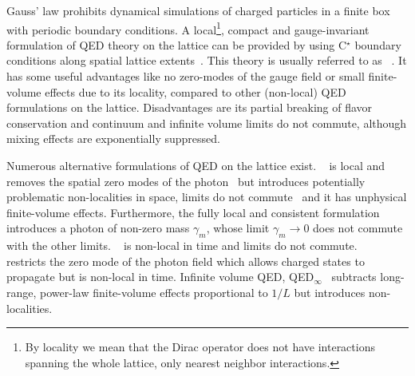 Gauss' law prohibits dynamical simulations of charged particles in a finite box with periodic boundary conditions.
A local\footnote{By locality we mean that the Dirac operator does not have interactions spanning the whole lattice, \ie only nearest neighbor interactions.}, compact and gauge-invariant formulation of QED theory on the lattice can be provided by using C$^{\star}$ boundary conditions along spatial lattice extents~\cite{cstar:Wiese1992,cstar:Polley1993,cstar:Kronfeld1991,cstar:Kronfeld1993}.
This theory is usually referred to as ~\cite{Lucini:2015}.
It has some useful advantages like no zero-modes of the gauge field or small finite-volume effects due to its locality, compared to other (non-local) QED formulations on the lattice.
Disadvantages are its partial breaking of flavor conservation and continuum and infinite volume limits do not commute, although mixing effects are exponentially suppressed.

Numerous alternative formulations of QED on the lattice exist.
~\cite{BMW:2014pzb,10.1143/PTP.120.413} is local and removes the spatial zero modes of the photon~\cite{Lucini:2015} but introduces potentially problematic non-localities in space, limits do not commute~\cite{Patella:2017fgk} and it has unphysical finite-volume effects.
Furthermore, the fully local and consistent formulation ~\cite{PhysRevLett.117.072002} introduces a photon of non-zero mass $\gamma_m$, whose limit $\gamma_m \to 0$ does not commute with the other limits.
~\cite{Duncan:1996xy} is non-local in time and limits do not commute.
~\cite{Gockeler:1989wj} restricts the zero mode of the photon field which allows charged states to propagate but is non-local in time.
Infinite volume QED, QED$_{\infty}$~\cite{Asmussen:2016lse,Blum:2017cer,RBC_2018,Feng:2018qpx} subtracts  long-range, power-law finite-volume effects proportional to $1/L$ but introduces non-localities.


